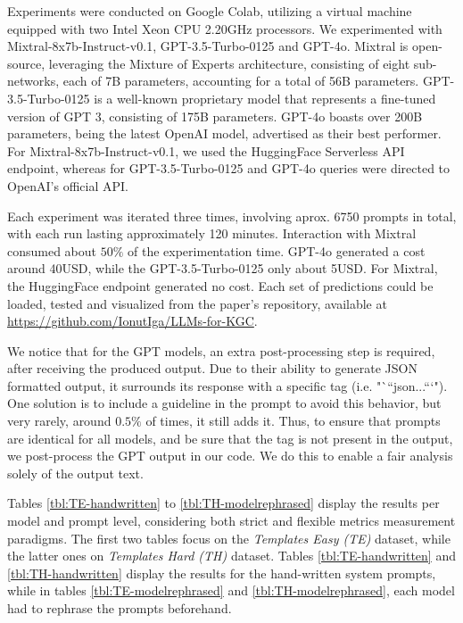 \documentclass[runningheads]{llncs}
\begin{document}
Experiments were conducted on Google Colab, utilizing a virtual machine equipped with two Intel Xeon CPU 2.20GHz processors.
We experimented with Mixtral-8x7b-Instruct-v0.1, GPT-3.5-Turbo-0125 and GPT-4o. Mixtral is open-source, leveraging the Mixture of Experts\cite{mixtral} architecture, consisting of eight sub-networks, each of 7B parameters, accounting for a total of 56B parameters. GPT-3.5-Turbo-0125 is a well-known proprietary model that represents a fine-tuned version of GPT 3, consisting of 175B parameters.
GPT-4o boasts over 200B parameters, being the latest OpenAI model, advertised as their best performer. 
For Mixtral-8x7b-Instruct-v0.1, we used the HuggingFace Serverless API endpoint, whereas for GPT-3.5-Turbo-0125 and GPT-4o queries were directed to OpenAI's official API.




Each experiment was iterated three times, involving aprox. 6750 prompts in total, with each run lasting approximately 120 minutes. Interaction with Mixtral consumed about $50\%$ of the experimentation time. 
GPT-4o generated a cost around 40USD, while the GPT-3.5-Turbo-0125 only about 5USD.
For Mixtral, the HuggingFace endpoint generated no cost. 
Each set of predictions could  be loaded, tested and visualized from the paper’s repository, available at \url{https://github.com/IonutIga/LLMs-for-KGC}.

We notice that for the GPT models, an extra post-processing step is required, after receiving the produced output. Due to their ability to generate JSON formatted output, it surrounds its response with a specific tag (i.e. "```json...```"). One solution is to include a guideline in the prompt to avoid this behavior, but very rarely, around $0.5\%$ of times, it still adds it. Thus, to ensure that prompts are identical for all models, and be sure that the tag is not present in the output,  we post-process the GPT output in our code. We do this to enable a fair analysis solely of the output text.

Tables \ref{tbl:TE-handwritten} to \ref{tbl:TH-modelrephrased} display the results per model and prompt level, considering both strict and flexible metrics measurement paradigms. The first two tables focus on the \textit{Templates Easy (TE)} dataset, while the latter ones on \textit{Templates Hard (TH)} dataset. Tables \ref{tbl:TE-handwritten} and \ref{tbl:TH-handwritten} display the results for the hand-written system prompts, while in tables \ref{tbl:TE-modelrephrased} and \ref{tbl:TH-modelrephrased}, each model had to rephrase the prompts beforehand. 
\end{document}
